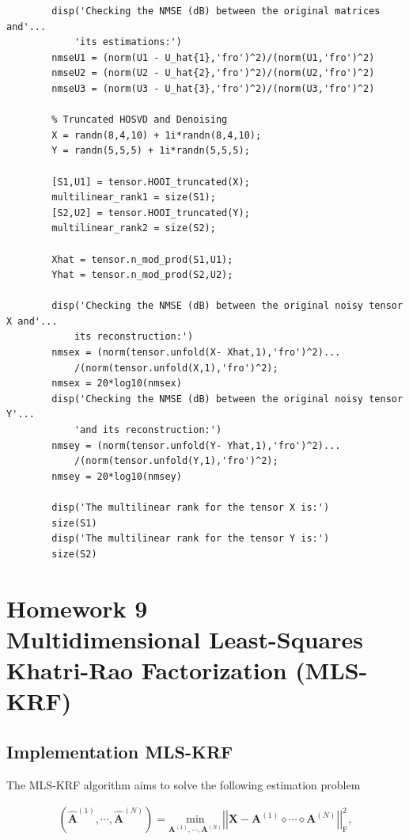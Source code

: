 \documentclass[a4paper,10pt]{article}
\begin{document}
\begin{verbatim}
        disp('Checking the NMSE (dB) between the original matrices and'...
            'its estimations:')
        nmseU1 = (norm(U1 - U_hat{1},'fro')^2)/(norm(U1,'fro')^2)
        nmseU2 = (norm(U2 - U_hat{2},'fro')^2)/(norm(U2,'fro')^2)
        nmseU3 = (norm(U3 - U_hat{3},'fro')^2)/(norm(U3,'fro')^2)

        % Truncated HOSVD and Denoising
        X = randn(8,4,10) + 1i*randn(8,4,10);
        Y = randn(5,5,5) + 1i*randn(5,5,5);

        [S1,U1] = tensor.HOOI_truncated(X);
        multilinear_rank1 = size(S1);
        [S2,U2] = tensor.HOOI_truncated(Y);
        multilinear_rank2 = size(S2);

        Xhat = tensor.n_mod_prod(S1,U1);
        Yhat = tensor.n_mod_prod(S2,U2);

        disp('Checking the NMSE (dB) between the original noisy tensor X and'...
            its reconstruction:')
        nmsex = (norm(tensor.unfold(X- Xhat,1),'fro')^2)...
            /(norm(tensor.unfold(X,1),'fro')^2);
        nmsex = 20*log10(nmsex)
        disp('Checking the NMSE (dB) between the original noisy tensor Y'...
            'and its reconstruction:')
        nmsey = (norm(tensor.unfold(Y- Yhat,1),'fro')^2)...
            /(norm(tensor.unfold(Y,1),'fro')^2);
        nmsey = 20*log10(nmsey)

        disp('The multilinear rank for the tensor X is:')
        size(S1)
        disp('The multilinear rank for the tensor Y is:')
        size(S2)
    \end{verbatim}
    
\newpage
\section*{Homework 9 \\ Multidimensional Least-Squares Khatri-Rao Factorization
(MLS-KRF)}

    \subsection*{Implementation MLS-KRF}
        
    The MLS-KRF algorithm aims to solve the following estimation problem 
    
    \begin{align}
        \left(\hat{\boldsymbol{A}}^{(1)}, \cdots, \hat{\boldsymbol{A}}^{(N)}\right) = \underset{\boldsymbol{A}^{(1)}, \cdots, \boldsymbol{A}^{(N)}}{\text{min}} \left|\left| \boldsymbol{X} - \boldsymbol{A}^{(1)} \diamond \cdots \diamond \boldsymbol{A}^{(N)} \right|\right|^2_{\text{F}},
    \end{align}
\end{document}
